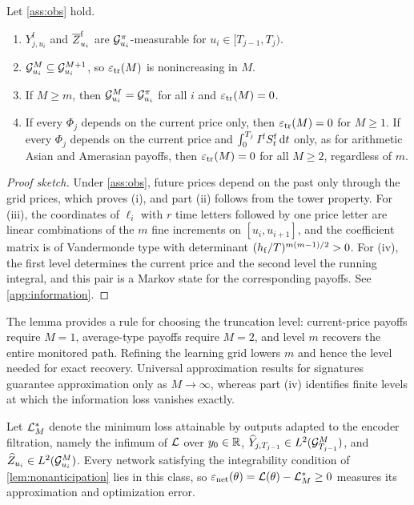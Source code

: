 \begin{lemma}[information]\label{lem:information}
Let \cref{ass:obs} hold.
\begin{enumerate}[label=(\roman*)]
\item $Y^{\mathrm f}_{j,u_i}$ and $\overline Z^{\mathrm f}_{u_i}$ are $\mathcal{G}^{\pi}_{u_i}$-measurable for $u_i\in[T_{j-1},T_j)$.
\item $\mathcal{G}^{M}_{u_i}\subseteq\mathcal{G}^{M+1}_{u_i}$, so $\varepsilon_{\mathrm{tr}}(M)$ is nonincreasing in $M$.
\item If $M\ge m$, then $\mathcal{G}^{M}_{u_i}=\mathcal{G}^{\pi}_{u_i}$ for all $i$ and $\varepsilon_{\mathrm{tr}}(M)=0$.
\item If every $\Phi_j$ depends on the current price only, then $\varepsilon_{\mathrm{tr}}(M)=0$ for $M\ge1$. If every $\Phi_j$ depends on the current price and $\int_0^{T_j}I^{\mathrm f} S^{\mathrm f}_t\,\mathrm{d} t$ only, as for arithmetic Asian and Amerasian payoffs, then $\varepsilon_{\mathrm{tr}}(M)=0$ for all $M\ge2$, regardless of $m$.
\end{enumerate}
\end{lemma}

\begin{proof}[Proof sketch]
Under \cref{ass:obs}, future prices depend on the past only through the grid prices, which proves (i), and part (ii) follows from the tower property. For (iii), the coordinates of $\ell_i$ with $r$ time letters followed by one price letter are linear combinations of the $m$ fine increments on $[u_i,u_{i+1}]$, and the coefficient matrix is of Vandermonde type with determinant $(h_{\mathrm f}/T)^{m(m-1)/2}>0$. For (iv), the first level determines the current price and the second level the running integral, and this pair is a Markov state for the corresponding payoffs. See \cref{app:information}.
\end{proof}

\begin{remark}\label{rem:information}
The lemma provides a rule for choosing the truncation level: current-price payoffs require $M=1$, average-type payoffs require $M=2$, and level $m$ recovers the entire monitored path. Refining the learning grid lowers $m$ and hence the level needed for exact recovery. Universal approximation results for signatures \cite{lyons1998,cuchiero2025} guarantee approximation only as $M\to\infty$, whereas part (iv) identifies finite levels at which the information loss vanishes exactly.
\end{remark}

Let $\mathcal{L}^{*}_{M}$ denote the minimum loss attainable by outputs adapted to the encoder filtration, namely the infimum of $\mathcal{L}$ over $y_0\in\mathbb{R}$, $\widehat Y_{j,T_{j-1}}\in L^2(\mathcal{G}^{M}_{T_{j-1}})$, and $\widehat Z_{u_i}\in L^2(\mathcal{G}^{M}_{u_i})$. Every network satisfying the integrability condition of \cref{lem:nonanticipation} lies in this class, so $\varepsilon_{\mathrm{net}}(\theta)=\mathcal{L}(\theta)-\mathcal{L}^{*}_{M}\ge0$ measures its approximation and optimization error.

